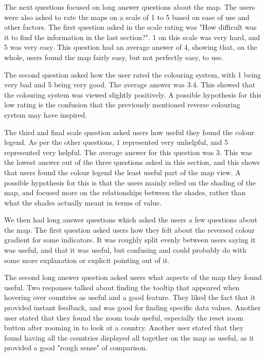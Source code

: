 \documentclass[10pt, journal]{IEEEtran}
\begin{document}
The next questions focused on long answer questions about the map. The users were also asked to rate the maps on a scale of 1 to 5 based on ease of use and other factors. The first question asked in the scale rating was "How difficult was it to find the information in the last section?".  1 on this scale was very hard, and 5 was very easy. This question had an average answer of 4, showing that, on the whole, users found the map fairly easy, but not perfectly easy, to use. 

The second question asked how the user rated the colouring system, with 1 being very bad and 5 being very good. The average answer was 3.4. This showed that the colouring system was viewed slightly positively. A possible hypothesis for this low rating is the confusion that the previously mentioned reverse colouring system may have inspired.

The third and final scale question asked users how useful they found the colour legend. As per the other questions, 1 represented very unhelpful, and 5 represented very helpful. The average answer for this question was 3. This was the lowest answer out of the three questions asked in this section, and this shows that users found the colour legend the least useful part of the map view. A possible hypothesis for this is that the users mainly relied on the shading of the map, and focused more on the relationships between the shades, rather than what the shades actually meant in terms of value.

We then had long answer questions which asked the users a few questions about the map. The first question asked users how they felt about the reversed colour gradient for some indicators. It was roughly split evenly between users saying it was useful, and that it was useful, but confusing and could probably do with some more explanation or explicit pointing out of it. 

The second long answer question asked users what aspects of the map they found useful. Two responses talked about finding the tooltip that appeared when hovering over countries as useful and a good feature. They liked the fact that it provided instant feedback, and was good for finding specific data values. Another user stated that they found the zoom tools useful, especially the reset zoom button after zooming in to look at a country. Another user stated that they found having all the countries displayed all together on the map as useful, as it provided a good "rough sense" of comparison.
\end{document}
